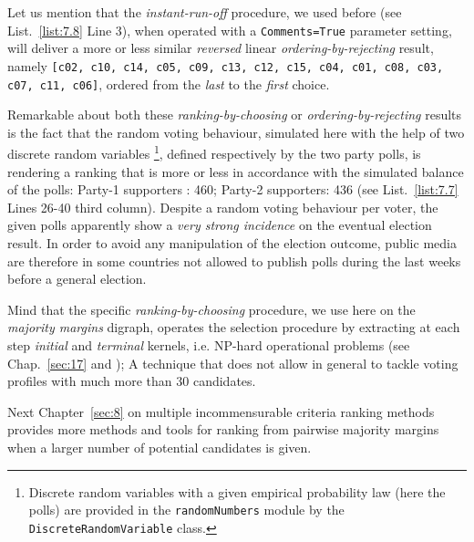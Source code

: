 Let us mention that the \emph{instant-run-off} procedure, we used before (see List.~\vref{list:7.8} Line 3), when operated with a \texttt{Comments=True} parameter setting, will deliver a more or less similar \emph{reversed} linear \emph{ordering-by-rejecting} result, namely \texttt{[c02, c10, c14, c05, c09, c13, c12, c15, c04, c01, c08, c03, c07, c11, c06]}, ordered from the \emph{last} to the \emph{first} choice.

Remarkable about both these \emph{ranking-by-choosing} or \emph{ordering-by-rejecting} results is the fact that the random voting behaviour, simulated here with the help of two discrete random variables \footnote{Discrete random variables with a given empirical probability law (here the polls) are provided in the \texttt{randomNumbers} module by the \texttt{DiscreteRandomVariable} class.}, defined respectively by the two party polls, is rendering a ranking that is more or less in accordance with the simulated balance of the polls: Party-1 supporters : 460;  Party-2 supporters: 436 (see List.~\vref{list:7.7} Lines 26-40 third column). Despite a random voting behaviour per voter, the given polls apparently show a \emph{very strong incidence} on the eventual election result. In order to avoid any manipulation of the election outcome, public media are therefore in some countries not allowed to publish polls during the last weeks before a general election.

Mind that the specific \emph{ranking-by-choosing} procedure, we use here on the \emph{majority margins} digraph, operates the selection procedure by extracting at each step \emph{initial} and \emph{terminal} kernels, i.e. NP-hard operational problems (see Chap.~\vref{sec:17} and \citet{BIS-1999}); A technique that does not allow in general to tackle voting profiles with much more than 30 candidates.

\vspace{1cm}

Next Chapter~\vref{sec:8} on multiple incommensurable criteria ranking methods provides more methods and tools for ranking from pairwise majority margins when a larger number of potential candidates is given.  



%